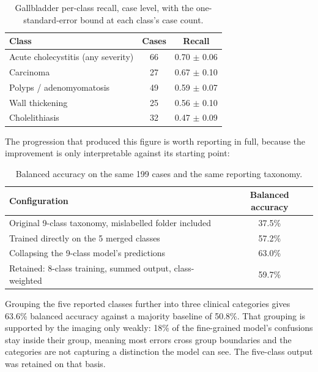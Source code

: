 \begin{table}[H]
  \centering
  \small
  \caption{Gallbladder per-class recall, case level, with the one-standard-error bound at each
    class's case count.}
  \label{tab:gb-results}
  \begin{tabular}{@{}lcc@{}}
    \toprule
    Class & Cases & Recall \\
    \midrule
    Acute cholecystitis (any severity) & 66 & 0.70 $\pm$ 0.06 \\
    Carcinoma & 27 & 0.67 $\pm$ 0.10 \\
    Polyps / adenomyomatosis & 49 & 0.59 $\pm$ 0.07 \\
    Wall thickening & 25 & 0.56 $\pm$ 0.10 \\
    Cholelithiasis & 32 & 0.47 $\pm$ 0.09 \\
    \bottomrule
  \end{tabular}
\end{table}

The progression that produced this figure is worth reporting in full, because the improvement is
only interpretable against its starting point:

\begin{table}[H]
  \centering
  \small
  \caption{Balanced accuracy on the same 199 cases and the same reporting taxonomy.}
  \label{tab:gb-progression}
  \begin{tabular}{@{}lc@{}}
    \toprule
    Configuration & Balanced accuracy \\
    \midrule
    Original 9-class taxonomy, mislabelled folder included & 37.5\% \\
    Trained directly on the 5 merged classes & 57.2\% \\
    Collapsing the 9-class model's predictions & 63.0\% \\
    Retained: 8-class training, summed output, class-weighted & 59.7\% \\
    \bottomrule
  \end{tabular}
\end{table}

Grouping the five reported classes further into three clinical categories gives 63.6\% balanced
accuracy against a majority baseline of 50.8\%. That grouping is supported by the imaging only
weakly: 18\% of the fine-grained model's confusions stay inside their group, meaning most errors
cross group boundaries and the categories are not capturing a distinction the model can see.
The five-class output was retained on that basis.

